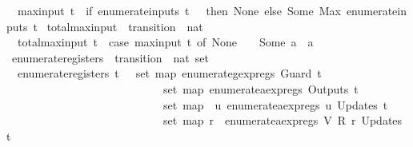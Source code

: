 \begin{isabellebody}
\ \ {\isachardoublequoteopen}max{\isacharunderscore}input\ t\ {\isacharequal}\ {\isacharparenleft}if\ enumerate{\isacharunderscore}inputs\ t\ {\isacharequal}\ {\isacharbraceleft}{\isacharbraceright}\ then\ None\ else\ Some\ {\isacharparenleft}Max\ {\isacharparenleft}enumerate{\isacharunderscore}inputs\ t{\isacharparenright}{\isacharparenright}{\isacharparenright}{\isachardoublequoteclose}\isanewline
\isanewline
{}\isamarkupfalse%
\ total{\isacharunderscore}max{\isacharunderscore}input\ {\isacharcolon}{\isacharcolon}\ {\isachardoublequoteopen}transition\ {\isasymRightarrow}\ nat{\isachardoublequoteclose}\ \isanewline
\ \ {\isachardoublequoteopen}total{\isacharunderscore}max{\isacharunderscore}input\ t\ {\isacharequal}\ {\isacharparenleft}case\ max{\isacharunderscore}input\ t\ of\ None\ {\isasymRightarrow}\ {}\ {\isacharbar}\ Some\ a\ {\isasymRightarrow}\ a{\isacharparenright}{\isachardoublequoteclose}\isanewline
\isanewline
{}\isamarkupfalse%
\ enumerate{\isacharunderscore}registers\ {\isacharcolon}{\isacharcolon}\ {\isachardoublequoteopen}transition\ {\isasymRightarrow}\ nat\ set{\isachardoublequoteclose}\ \isanewline
\ \ {\isachardoublequoteopen}enumerate{\isacharunderscore}registers\ t\ {\isacharequal}\ {\isacharparenleft}{\isasymUnion}\ {\isacharparenleft}set\ {\isacharparenleft}map\ enumerate{\isacharunderscore}gexp{\isacharunderscore}regs\ {\isacharparenleft}Guard\ t{\isacharparenright}{\isacharparenright}{\isacharparenright}{\isacharparenright}\ {\isasymunion}\isanewline
\ \ \ \ \ \ \ \ \ \ \ \ \ \ \ \ \ \ \ \ \ \ \ \ \ \ \ {\isacharparenleft}{\isasymUnion}\ {\isacharparenleft}set\ {\isacharparenleft}map\ enumerate{\isacharunderscore}aexp{\isacharunderscore}regs\ {\isacharparenleft}Outputs\ t{\isacharparenright}{\isacharparenright}{\isacharparenright}{\isacharparenright}\ {\isasymunion}\isanewline
\ \ \ \ \ \ \ \ \ \ \ \ \ \ \ \ \ \ \ \ \ \ \ \ \ \ \ {\isacharparenleft}{\isasymUnion}\ {\isacharparenleft}set\ {\isacharparenleft}map\ {\isacharparenleft}{\isasymlambda}{\isacharparenleft}{\isacharunderscore}{\isacharcomma}\ u{\isacharparenright}{\isachardot}\ enumerate{\isacharunderscore}aexp{\isacharunderscore}regs\ u{\isacharparenright}\ {\isacharparenleft}Updates\ t{\isacharparenright}{\isacharparenright}{\isacharparenright}{\isacharparenright}\ {\isasymunion}\isanewline
\ \ \ \ \ \ \ \ \ \ \ \ \ \ \ \ \ \ \ \ \ \ \ \ \ \ \ {\isacharparenleft}{\isasymUnion}\ {\isacharparenleft}set\ {\isacharparenleft}map\ {\isacharparenleft}{\isasymlambda}{\isacharparenleft}r{\isacharcomma}\ {\isacharunderscore}{\isacharparenright}{\isachardot}\ enumerate{\isacharunderscore}aexp{\isacharunderscore}regs\ {\isacharparenleft}V\ {\isacharparenleft}R\ r{\isacharparenright}{\isacharparenright}{\isacharparenright}\ {\isacharparenleft}Updates\ t{\isacharparenright}{\isacharparenright}{\isacharparenright}{\isacharparenright}{\isachardoublequoteclose}\isanewline

\end{isabellebody}
